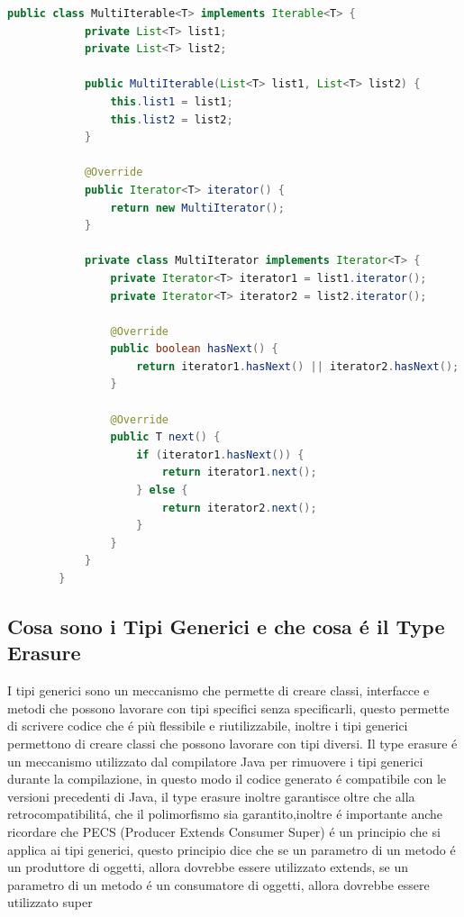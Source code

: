 \documentclass[11pt]{article}
\begin{document}
    \begin{lstlisting}[language=Java]
        public class MultiIterable<T> implements Iterable<T> {
            private List<T> list1;
            private List<T> list2;

            public MultiIterable(List<T> list1, List<T> list2) {
                this.list1 = list1;
                this.list2 = list2;
            }

            @Override
            public Iterator<T> iterator() {
                return new MultiIterator();
            }

            private class MultiIterator implements Iterator<T> {
                private Iterator<T> iterator1 = list1.iterator();
                private Iterator<T> iterator2 = list2.iterator();

                @Override
                public boolean hasNext() {
                    return iterator1.hasNext() || iterator2.hasNext();
                }

                @Override
                public T next() {
                    if (iterator1.hasNext()) {
                        return iterator1.next();
                    } else {
                        return iterator2.next();
                    }
                }
            }
        }
    \end{lstlisting}
    \subsection{Cosa sono i Tipi Generici e che cosa é il Type Erasure}
    I tipi generici sono un meccanismo che permette di creare classi, interfacce e metodi che possono lavorare con tipi specifici senza specificarli,
    questo permette di scrivere codice che é più flessibile e riutilizzabile, inoltre i tipi generici permettono di creare classi che possono lavorare con tipi diversi.
    Il type erasure é un meccanismo utilizzato dal compilatore Java per rimuovere i tipi generici durante la compilazione, in questo modo il codice generato é compatibile con le versioni precedenti di Java,
    il type erasure inoltre garantisce oltre che alla retrocompatibilitá, che il polimorfismo sia garantito,inoltre é importante anche ricordare che PECS (Producer Extends Consumer Super) é un principio che si applica ai tipi generici,
    questo principio dice che se un parametro di un metodo é un produttore di oggetti, allora dovrebbe essere utilizzato extends, se un parametro di un metodo é un consumatore di oggetti, allora dovrebbe essere utilizzato super
\end{document}
